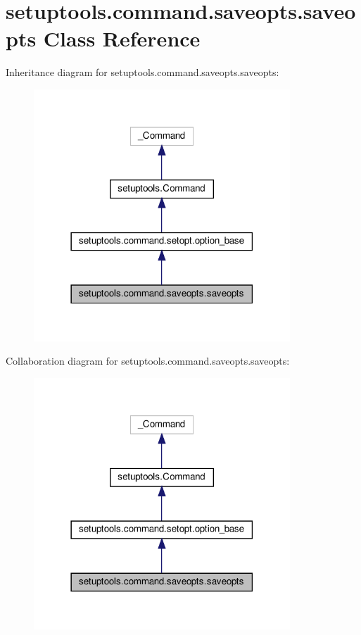 \hypertarget{classsetuptools_1_1command_1_1saveopts_1_1saveopts}{}\section{setuptools.\+command.\+saveopts.\+saveopts Class Reference}
\label{classsetuptools_1_1command_1_1saveopts_1_1saveopts}


Inheritance diagram for setuptools.\+command.\+saveopts.\+saveopts\+:
\nopagebreak
\begin{figure}[H]
\begin{center}
\leavevmode
\includegraphics[width=273pt]{classsetuptools_1_1command_1_1saveopts_1_1saveopts__inherit__graph}
\end{center}
\end{figure}


Collaboration diagram for setuptools.\+command.\+saveopts.\+saveopts\+:
\nopagebreak
\begin{figure}[H]
\begin{center}
\leavevmode
\includegraphics[width=273pt]{classsetuptools_1_1command_1_1saveopts_1_1saveopts__coll__graph}
\end{center}
\end{figure}
